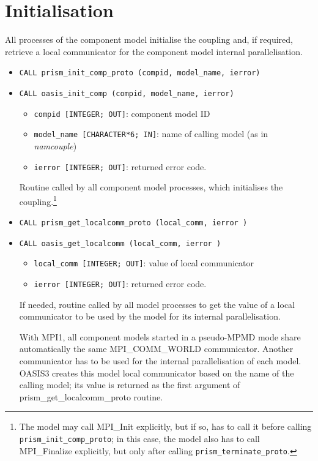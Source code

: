 \section{Initialisation}
\label{subsubsec_Initialisation}

All processes of the component model initialise the coupling and, if
required, retrieve a local communicator for the component model
internal parallelisation.

\begin{itemize}

\item {\tt CALL prism\_init\_comp\_proto (compid, model\_name, ierror)} 
\item {\tt CALL oasis\_init\_comp        (compid, model\_name, ierror)} 

 \begin{itemize}
   \item {\tt compid [INTEGER; OUT]}: component model ID 
   \item {\tt model\_name [CHARACTER*6; IN]}: name of calling model (as in
  {\em namcouple}) 
   \item {\tt ierror [INTEGER; OUT]}: returned error code.
 \end{itemize}
 
Routine called by all component model processes, which initialises the
coupling.\footnote{The model may call MPI\_Init explicitly, but if so, has to
call it before calling {\tt prism\_init\_comp\_proto}; in this case, the
model also has to call MPI\_Finalize explicitly, but only after calling
{\tt prism\_terminate\_proto}.}

\item {\tt CALL prism\_get\_localcomm\_proto (local\_comm, ierror )}
\item {\tt CALL oasis\_get\_localcomm        (local\_comm, ierror )}

 \begin{itemize}
   \item {\tt local\_comm [INTEGER; OUT]}: value of local communicator
   \item {\tt ierror [INTEGER; OUT]}: returned error code.
 \end{itemize}

  If needed, routine called by all model processes  
  to get the value of a local communicator to be used by the
  model for its internal parallelisation.

  With MPI1, all component models started in a
  pseudo-MPMD mode share automatically the same MPI\_COMM\_WORLD
  communicator.  Another communicator has to be used for the internal
  parallelisation of each model. OASIS3 creates this model local
  communicator based on the name of the calling model; its value is returned
  as the first argument of prism\_get\_localcomm\_proto routine.


\end{itemize}
